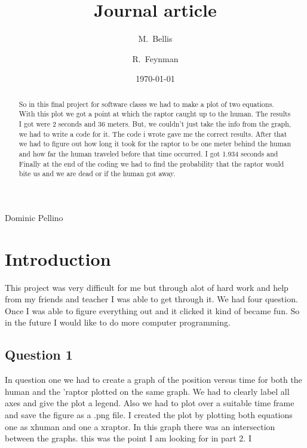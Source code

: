\documentclass[twocolumn]{revtex4}
\begin{document}
Dominic Pellino

\title{
Journal article
}

\author{M.~Bellis}
\author{R.~Feynman}

\date{\today}

\begin{abstract}
 So in this final project for software classs we had to make a plot of two equations. With this plot we got a point at which the raptor caught up to the human. The results I got were 2 seconds and 36 meters. But, we couldn't just take the info from the graph, we had to write a code for it. The code i wrote gave me the correct results. After that we had to figure out how long it took for the raptor to be one meter behind the human and how far the human traveled before that time occurred. I got 1.934 seconds and  Finally at the end of the coding we had to find the probability that the raptor would bite us and we are dead or if the human got away. 
\end{abstract}

\maketitle

\section{Introduction}
This project was very difficult for me but through alot of hard work and help from my friends and teacher I was able to get through it. We had four question. Once I was able to figure everything out and it clicked it kind of became fun. So in the future I would like to do more computer programming.

\subsection{Question 1}
In question one we had to create a graph of the position versus time for both the human and the 'raptor plotted on the same graph. We had to clearly label all axes and give the plot a legend. Also we had to plot over a suitable time frame and save the figure as a .png file. I created the plot by plotting both equations one as xhuman and one a xraptor. In this graph there was an intersection between the graphs. this was the point I am looking for in part 2. I 
\end{document}
